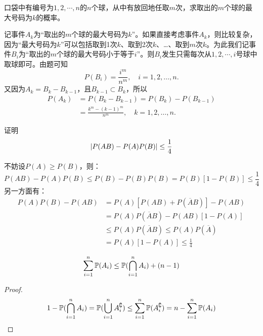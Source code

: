 \begin{example}
    口袋中有编号为$1, 2, \cdots, n$的$n$个球，从中有放回地任取$m$次，求取出的$m$个球的最大号码为$k$的概率。
\end{example}
\begin{solution}
    记事件$A_k$为“取出的$m$个球的最大号码为$k$”。如果直接考虑事件$A_k$，则比较复杂，因为“最大号码为$k$”可以包括取到1次$k$、取到2次$k$、\dots、取到$m$次$k$。为此我们记事件$B_i$为“取出的$m$个球的最大号码小于等于$i$”。则$B_i$发生只需每次从$1,2,\cdots ,i$号球中取球即可。由题可知
    \[  P(B_i) = \frac{i^m}{n^m}, \quad i = 1, 2, \dotsc, n. \]
    又因为$A_k = B_k - B_{k-1}$，且$B_{k-1} \subset B_k$，所以
    \begin{align*}
        P(A_k) & = P(B_k - B_{k-1}) = P(B_k) - P(B_{k-1})                 \\
               & = \frac{k^m - (k - 1)^m}{n^m}, \quad k = 1,2, \dotsc, n.
    \end{align*}
\end{solution}

\begin{example}[]\label{ex:inequality_event}
    证明
    \[ \abs{P(AB) - P(A)P(B)} \le \frac1{4} \]
\end{example}
\begin{solution}
    不妨设$P(A)\ge P(B)$，则：
    \[ P(AB)-P(A)P(B)\le P(B)-P(B)P(B)=P(B)[1-P(B)]\le \frac1{4} \]
    另一方面有：
    \begin{align*}
        P(A)P(B)-P(AB) & =P(A)[P(AB)+P(\overline{A}B)]-P(AB)              \\
                       & =P(A)P(\overline{A}B)-P(AB)[1-P(A)]              \\
                       & \le P(A)P(\overline{A}B) \le P(A)P(\overline{A}) \\
                       & =P(A)[1-P(A)]\le \frac1{4}
    \end{align*}
\end{solution}

\begin{corollary}
    \[ \sum_{i=1}^n \P(A_i) \le \P(\bigcap_{i=1}^{n}A_i) + (n-1) \]
\end{corollary}
\begin{proof}
    \[ 1-\P(\bigcap_{i=1}^{n}A_i) = \P(\bigcup_{i=1}^{n}A_i^{\complement}) \le \sum_{i=1}^n \P(A_i^{\complement}) = n - \sum_{i=1}^n \P(A_i) \]
\end{proof}

